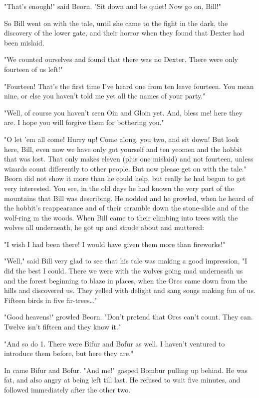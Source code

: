 \documentclass[twoside,11pt,b5paper,twocolumn]{scrbook}
\begin{document}
"That's enough!" said Beorn. "Sit down and be quiet! Now go on, Bill!"

So Bill went on with the tale, until she came to the fight in the dark, the discovery of the lower gate, and their horror when they found that Dexter had been mislaid.

"We counted ourselves and found that there was no Dexter. There were only fourteen of us left!"

"Fourteen! That's the first time I've heard one from ten leave fourteen. You mean nine, or else you haven't told me yet all the names of your party."

"Well, of course you haven't seen Oin and Gloin yet. And, bless me! here they are. I hope you will forgive them for bothering you."

"O let 'em all come! Hurry up! Come along, you two, and sit down! But look here, Bill, even now we have only got yourself and ten yeomen and the hobbit that was lost. That only makes eleven (plus one mislaid) and not fourteen, unless wizards count differently to other people. But now please get on with the tale." Beorn did not show it more than he could help, but really he had begun to get very interested. You see, in the old days he had known the very part of the mountains that Bill was describing. He nodded and he growled, when he heard of the hobbit's reappearance and of their scramble down the stone-slide and of the wolf-ring m the woods. When Bill came to their climbing into trees with the wolves all underneath, he got up and strode about and muttered:

"I wish I had been there! I would have given them more than fireworks!"

"Well," said Bill very glad to see that his tale was making a good impression, "I did the best I could. There we were with the wolves going mad underneath us and the forest beginning to blaze in places, when the Orcs came down from the hills and discovered us. They yelled with delight and sang songs making fun of us. Fifteen birds in five fir-trees…"

"Good heavens!" growled Beorn. "Don't pretend that Orcs can't count. They can. Twelve isn't fifteen and they know it."

"And so do 1. There were Bifur and Bofur as well. I haven't ventured to introduce them before, but here they are."

In came Bifur and Bofur. "And me!" gasped Bombur pulling up behind. He was fat, and also angry at being left till last. He refused to wait five minutes, and followed immediately after the other two.
\end{document}
